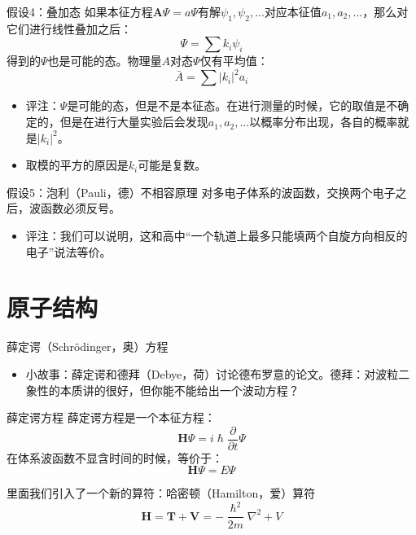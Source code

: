 \documentclass[10pt,compress,t]{ctexbeamer}
\begin{document}
\begin{frame}
\begin{block}{假设4：叠加态}
    如果本征方程$\bm{A} \Psi = a \Psi $有解$\psi_1, \psi_2, ...$对应本征值$a_1, a_2, ...$，那么对它们进行线性叠加之后：
    $$\Psi= \sum k_i \psi_i$$
    得到的$\Psi$也是可能的态。物理量$A$对态$\Psi$仅有平均值：
    $$\bar{A} = \sum |k_i|^2 a_i $$
\end{block}  
\begin{itemize}
  \item 评注：$\Psi$是可能的态，但是不是本征态。在进行测量的时候，它的取值是不确定的，但是在进行大量实验后会发现$a_1, a_2, ...$以概率分布出现，各自的概率就是$|k_i|^2$。
  \item 取模的平方的原因是$k_i$可能是复数。 
\end{itemize}
\end{frame}

\begin{frame}
\begin{block}{假设5：泡利（Pauli，德）不相容原理}
  对多电子体系的波函数，交换两个电子之后，波函数必须反号。
\end{block}  
\begin{itemize}
  \item
  评注：我们可以说明，这和高中“一个轨道上最多只能填两个自旋方向相反的电子”说法等价。
\end{itemize}
\end{frame}

\section{原子结构}
\begin{frame}{薛定谔（Schrödinger，奥）方程}
\begin{itemize}
  \item 小故事：薛定谔和德拜（Debye，荷）讨论德布罗意的论文。德拜：对波粒二象性的本质讲的很好，但你能不能给出一个波动方程？
\end{itemize}
\begin{block}{薛定谔方程}
  薛定谔方程是一个本征方程：
  $$\bm{H} \Psi = i\hslash \frac{\partial}{\partial t} \Psi $$
  在体系波函数不显含时间的时候，等价于：
  $$\bm{H} \Psi = E \Psi $$

  里面我们引入了一个新的算符：哈密顿（Hamilton，爱）算符
  $$\bm{H} = \bm{T} + \bm{V} = -\frac{\hslash^2}{2m} \nabla ^2 + V $$
\end{block}
\end{frame}
\end{document}
